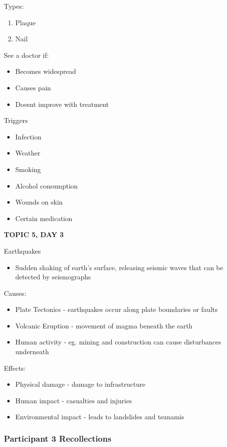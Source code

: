 {{Types: 
\begin{enumerate}
    \item Plaque
    \item Nail
\end{enumerate}


See a doctor if:
\begin{itemize}
    \item Becomes widespread
    \item Causes pain
    \item Doesnt improve with treatment
\end{itemize}


Triggers
\begin{itemize}
    \item Infection
    \item Weather
    \item Smoking
    \item Alcohol consumption
    \item Wounds on skin
    \item Certain medication
\end{itemize}

\textbf{TOPIC 5, DAY 3}


Earthquakes 
\begin{itemize}
    \item Sudden shaking of earth's surface, releasing seismic waves that can be detected by seismographs
\end{itemize}


Causes: 
\begin{itemize}
    \item Plate Tectonics - earthquakes occur along plate boundaries or faults
    \item Volcanic Eruption - movement of magma beneath the earth
    \item Human activity - eg. mining and construction can cause disturbances underneath
\end{itemize}


Effects:
\begin{itemize}
    \item Physical damage - damage to infrastructure
    \item Human impact - casualties and injuries
    \item Environmental impact - leads to landslides and tsunamis
\end{itemize}

\subsubsection{Participant 3 Recollections}

}}
